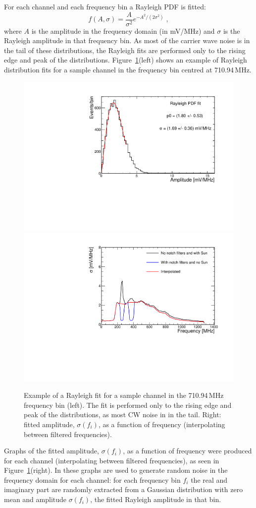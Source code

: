 For each channel and each frequency bin a Rayleigh PDF is fitted:
\begin{equation} 
  f(A, \sigma)=\dfrac{A}{\sigma^2}e^{-A^2/(2\sigma^2)} \;,
  \label{eq:rayleigh}
\end{equation}
\noindent where $A$ is the amplitude in the frequency domain (in mV/MHz) and $\sigma$ is the
Rayleigh amplitude in that frequency bin.
As most of the carrier wave noise is in the tail of these
distributions, the Rayleigh fits are performed only to the rising edge and peak of the distributions.
Figure~\ref{fig:rayleighFits}(left) shows an example of Rayleigh distribution fits for a sample channel in the frequency bin centred at 710.94\,MHz.
 
\begin{figure}[!h]\centering
  \includegraphics[width=.45\linewidth]{./Figs/RayleighExample.pdf}
  \includegraphics[width=.45\linewidth]{./Figs/RayleighSigma_1V_old.pdf}
  \caption{Example of a Rayleigh fit for a sample channel in the
    710.94\,MHz frequency bin (left). The fit is performed only to the rising edge and peak of the distributions, as most CW noise in in the tail. 
Right: fitted amplitude, $\sigma(f_i)$, as a
    function of frequency (interpolating
    between filtered frequencies). }
  \label{fig:rayleighFits}
\end{figure}

Graphs of the fitted amplitude, $\sigma(f_i)$, as a function of
frequency were produced for each channel (interpolating between
filtered frequencies), as seen in Figure~\ref{fig:rayleighFits}(right).
In \icemc these graphs are used to generate random noise in the
frequency domain for each channel: for each frequency bin $f_i$ the real and imaginary part are randomly extracted from a Gaussian distribution with zero mean and amplitude
$\sigma(f_i)$, the fitted Rayleigh amplitude in that bin.

